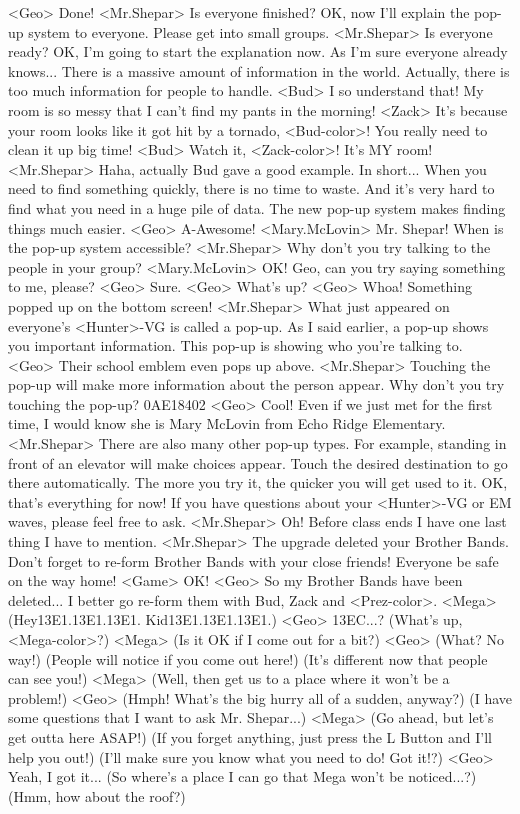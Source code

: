 <Geo> Done! 
<Mr.Shepar> Is everyone finished? 
OK, now I'll explain the pop-up system to everyone. 
Please get into small groups. 
<Mr.Shepar> Is everyone ready? 
OK, I'm going to start the explanation now. 
As I'm sure everyone already knows... 
There is a massive amount of information in the world. 
Actually, there is too much information for people to handle. 
<Bud> I so understand that! 
My room is so messy that I can't find my pants in the morning! 
<Zack> It's because your room looks like it got hit by a tornado, <Bud-color>! 
You really need to clean it up big time! 
<Bud> Watch it, <Zack-color>! It's MY room! 
<Mr.Shepar> Haha, actually Bud gave a good example. 
In short... 
When you need to find something quickly, there is no time to waste. 
And it's very hard to find what you need in a huge pile of data. 
The new pop-up system makes finding things much easier. 
<Geo> A-Awesome! 
<Mary.McLovin> Mr. Shepar! 
When is the pop-up system accessible? 
<Mr.Shepar> Why don't you try talking to the people in your group? 
<Mary.McLovin> OK! Geo, can you try saying something to me, please? 
<Geo> Sure. 
<Geo> What's up? 
<Geo> Whoa! Something popped up on the bottom screen! 
<Mr.Shepar> What just appeared on everyone's <Hunter>-VG is called a pop-up. 
As I said earlier, a pop-up shows you important information. 
This pop-up is showing who you're talking to. 
<Geo> Their school emblem even pops up above. 
<Mr.Shepar> Touching the pop-up will make more information about the person appear. 
Why don't you try touching the pop-up? {0A}{E1}{84}{02}
<Geo> Cool! Even if we just met for the first time, I would 
know she is Mary McLovin from Echo Ridge Elementary. 
<Mr.Shepar> There are also many other pop-up types. 
For example, standing in front of an elevator will make choices appear. 
Touch the desired destination to go there automatically. 
The more you try it, the quicker you will get used to it. 
OK, that's everything for now! If you have questions 
about your <Hunter>-VG or EM waves, please feel free to ask. 
<Mr.Shepar> Oh! Before class ends I have one last thing I have to mention. 
<Mr.Shepar> The upgrade deleted your Brother Bands. 
Don't forget to re-form Brother Bands with your close friends! 
Everyone be safe on the way home! 
<Game> OK! 
<Geo> So my Brother Bands have been deleted... 
I better go re-form them with Bud, Zack and <Prez-color>. 
<Mega> (Hey{13}{E1}.{13}{E1}.{13}{E1}. Kid{13}{E1}.{13}{E1}.{13}{E1}.) 
<Geo> {13}{EC}...? 
(What's up, <Mega-color>?) 
<Mega> (Is it OK if I come out  for a bit?) 
<Geo> (What? No way!) 
(People will notice if you  come out here!) 
(It's different now that  people can see you!) 
<Mega> (Well, then get us to a  place where it won't be  a problem!) 
<Geo> (Hmph! What's the big hurry  all of a sudden, anyway?) 
(I have some questions  that I want to ask  Mr. Shepar...) 
<Mega> (Go ahead, but let's get  outta here ASAP!) 
(If you forget anything,  just press the L Button  and I'll help you out!) 
(I'll make sure you know  what you need to do!  Got it!?) 
<Geo> Yeah, I got it... 
(So where's a place I can  go that Mega won't be  noticed...?) 
(Hmm, how about the roof?) 
